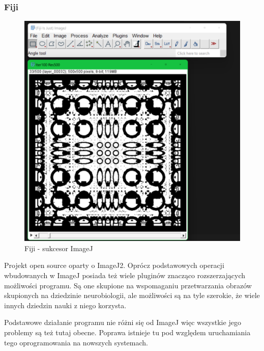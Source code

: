 \subsubsection{Fiji}
\begin{figure}[H]
    \centering
    \includegraphics[width=0.8\linewidth]{./images/Picture4.png}
    \caption{Fiji - sukcesor ImageJ}
    \label{fig:fiji}
\end{figure}
Projekt open source oparty o ImageJ2. Oprócz podstawowych operacji wbudowanych w ImageJ posiada też wiele pluginów znacząco rozszerzających możliwości programu. 
Są one skupione na wspomaganiu przetwarzania obrazów skupionych na dziedzinie neurobiologii, ale możliwości są na tyle szerokie, że wiele innych dziedzin nauki z niego korzysta.

Podstawowe działanie programu nie różni się od ImageJ więc wszystkie jego problemy są też tutaj obecne. Poprawa istnieje tu pod względem uruchamiania tego oprogramowania na nowszych systemach.

